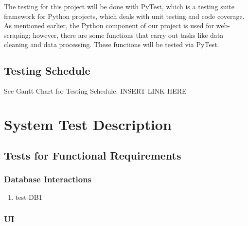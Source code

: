\documentclass[12pt, titlepage]{article}
\begin{document}
The testing for this project will be done with PyTest, which is a testing suite framework for Python projects, which deals with unit testing and code coverage. As mentioned earlier, the Python component of our project is used for web-scraping; however, there are some functions that carry out tasks like data cleaning and data processing. These functions will be tested via PyTest.

\subsection{Testing Schedule}

See Gantt Chart for Testing Schedule. INSERT LINK HERE

\section{System Test Description}

\subsection{Tests for Functional Requirements}

\subsubsection{Database Interactions}

\begin{enumerate}
\item{test-DB1\\}
\end{enumerate}

\subsubsection{UI}
\end{document}
